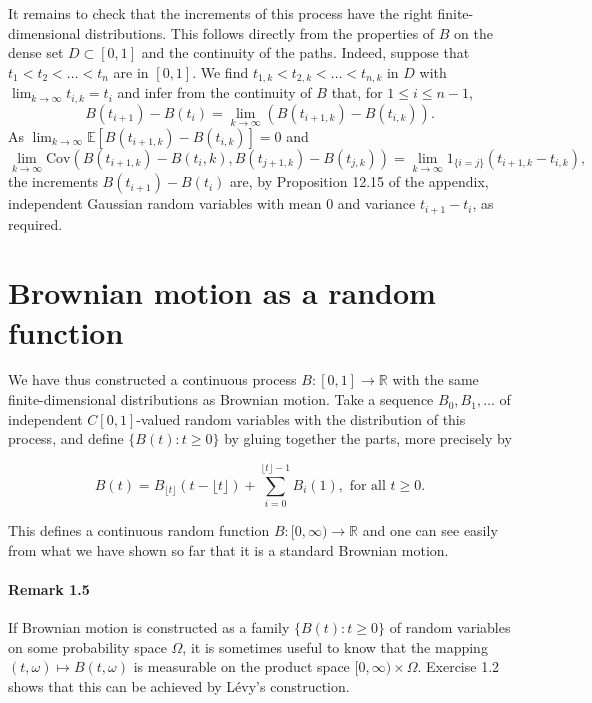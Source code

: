 \documentclass{article}
\begin{document}
It remains to check that the increments of this process have the right finite-dimensional distributions. This follows directly from the properties of $B$ on the dense set $D \subset [0, 1]$ and the continuity of the paths. Indeed, suppose that $t_1 < t_2 < \dots < t_n$ are in $[0, 1]$. We find $t_{1,k} < t_{2,k} < \dots < t_{n,k}$ in $D$ with $\lim_{k \to \infty} t_{i,k} = t_i$ and infer from the continuity of $B$ that, for $1 \leq i \leq n - 1$,
\[
    B(t_{i+1}) - B(t_i) = \lim_{k \to \infty} (B(t_{i+1,k}) - B(t_{i,k})).
\]
As $\lim_{k \to \infty} \mathbb{E} \left[ B(t_{i+1,k}) - B(t_{i,k}) \right] = 0$ and
\[
    \lim_{k \to \infty} \text{Cov} \left( B(t_{i+1,k}) - B(t_i,k), B(t_{j+1,k}) - B(t_{j,k}) \right)
    = \lim_{k \to \infty} 1_{\{i=j\}} (t_{i+1,k} - t_{i,k}),
\]
the increments $B(t_{i+1}) - B(t_i)$ are, by Proposition 12.15 of the appendix, independent Gaussian random variables with mean $0$ and variance $t_{i+1} - t_i$, as required.



\section*{Brownian motion as a random function}

We have thus constructed a continuous process $B : [0, 1] \rightarrow \mathbb{R}$ with the same finite-dimensional distributions as Brownian motion. Take a sequence $B_0, B_1, \ldots$ of independent $C[0,1]$-valued random variables with the distribution of this process, and define $\{B(t) : t \geq 0\}$ by gluing together the parts, more precisely by

\[
B(t) = B_{\lfloor t \rfloor}(t - \lfloor t \rfloor) + \sum_{i=0}^{\lfloor t \rfloor - 1} B_i(1), \text{ for all } t \geq 0.
\]

This defines a continuous random function $B : [0, \infty) \rightarrow \mathbb{R}$ and one can see easily from what we have shown so far that it is a standard Brownian motion.

\paragraph{Remark 1.5} If Brownian motion is constructed as a family $\{B(t) : t \geq 0\}$ of random variables on some probability space $\Omega$, it is sometimes useful to know that the mapping $(t, \omega) \mapsto B(t, \omega)$ is measurable on the product space $[0, \infty) \times \Omega$. Exercise 1.2 shows that this can be achieved by Lévy’s construction.
\end{document}
